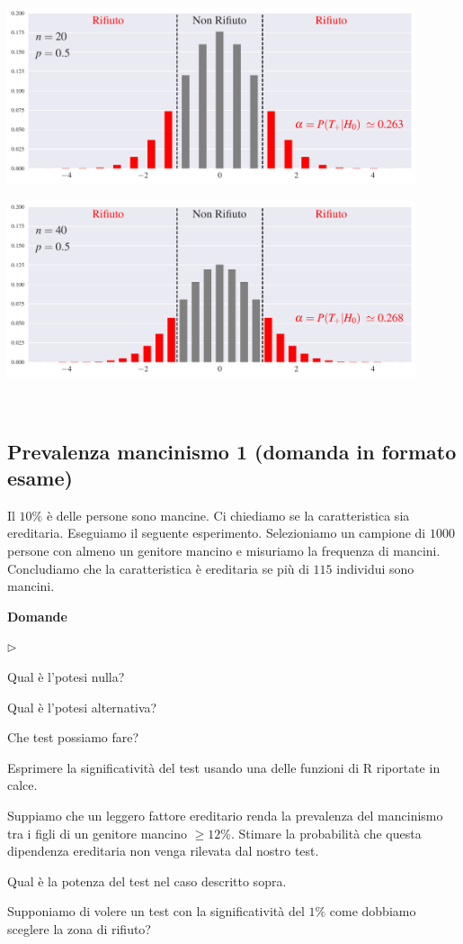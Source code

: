\documentclass[12pt,openany]{book}
\newcommand{\mylabel}[1]{{\footnotesize\textsf{#1}}\hfill}
\renewenvironment{itemize}
  {\begin{list}{$\triangleright$}{%
   \setlength{\parskip}{0mm}
   \setlength{\topsep}{.2\baselineskip}
   \setlength{\rightmargin}{0mm}
   \setlength{\listparindent}{0mm}
   \setlength{\itemindent}{0mm}
   \setlength{\labelwidth}{3ex}
   \setlength{\itemsep}{.4\baselineskip}
   \setlength{\parsep}{0mm}
   \setlength{\partopsep}{0mm}
   \setlength{\labelsep}{1ex}
   \setlength{\leftmargin}{\labelwidth+\labelsep}
   \let\makelabel\mylabel}}{%
   \end{list}\vspace*{-1.3mm}}
\theoremstyle{mio}
\theoremstyle{liscio}
\begin{document}
\hfil\includegraphics[width=0.9\textwidth]{figure/B-test-standard2_01.pdf}

\hfil\includegraphics[width=0.9\textwidth]{figure/B-test-standard2_02.pdf}



\hfill{}\clearpage\
\subsection{Prevalenza mancinismo 1 (domanda in formato esame)}

Il $10\%$ è delle persone sono mancine. Ci chiediamo se la caratteristica sia ereditaria. Eseguiamo il seguente esperimento. Selezioniamo un campione di $1000$ persone con almeno un genitore mancino e misuriamo la frequenza di mancini. Concludiamo che la caratteristica \`e ereditaria se pi\`u di $115$ individui sono mancini.

\textbf{Domande}

\begin{itemize}
\item[1.] Qual è l'potesi nulla?

\item[2.] Qual è l'potesi alternativa?

\item[3.] Che test possiamo fare?

\item[4.] Esprimere la significatività del test usando una delle funzioni di R riportate in calce.

\item[5.] Suppiamo che un leggero fattore ereditario renda la prevalenza del mancinismo tra i figli di un genitore mancino $\ge12\%$. Stimare la probabilità che questa dipendenza ereditaria non venga rilevata dal nostro test. 

\item[6.] Qual è la potenza del test nel caso descritto sopra.

\item[7.] Supponiamo di volere un test con la significatività del $1\%$ come dobbiamo sceglere la zona di rifiuto?
\end{itemize}
\end{document}
